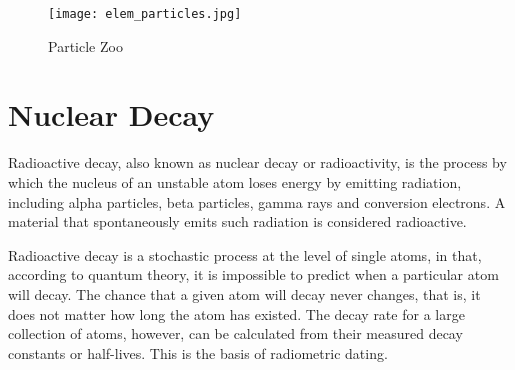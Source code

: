 \begin{figure}%
  \texttt{[image: elem\_particles.jpg]}
  \caption{Particle Zoo}
  \label{fig:marginfig}
\end{figure}

\newpage
\section{Nuclear Decay}
Radioactive decay, also known as nuclear decay or radioactivity, is the process by which the nucleus of an unstable atom loses energy by emitting radiation, including alpha particles, beta particles, gamma rays and conversion electrons. A material that spontaneously emits such radiation is considered radioactive.

Radioactive decay is a stochastic process at the level of single atoms, in that, according to quantum theory, it is impossible to predict when a particular atom will decay.  The chance that a given atom will decay never changes, that is, it does not matter how long the atom has existed. The decay rate for a large collection of atoms, however, can be calculated from their measured decay constants or half-lives. This is the basis of radiometric dating.
